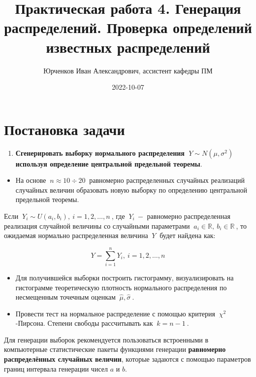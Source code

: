 \documentclass[
]{article}
\title{Практическая работа 4. Генерация распределений. Проверка
определений известных распределений}
\author{Юрченков Иван Александрович, ассистент кафедры ПМ}
\date{2022-10-07}
\providecommand{\tightlist}{%
  \setlength{\itemsep}{0pt}\setlength{\parskip}{0pt}}
\begin{document}
\maketitle

\hypertarget{ux43fux43eux441ux442ux430ux43dux43eux432ux43aux430-ux437ux430ux434ux430ux447ux438}{%
\section{\texorpdfstring{\textbf{Постановка
задачи}}{Постановка задачи}}\label{ux43fux43eux441ux442ux430ux43dux43eux432ux43aux430-ux437ux430ux434ux430ux447ux438}}

\begin{enumerate}
\def\labelenumi{\arabic{enumi}.}
\tightlist
\item
  \textbf{Сгенерировать выборку нормального распределения
  \(\ Y\sim N(\mu, \sigma^2)\ \) используя определение центральной
  предельной теоремы}.
\end{enumerate}

\begin{itemize}
\tightlist
\item
  На основе \(\ n \approx 10\div 20\ \) равномерно распределенных
  случайных реализаций случайных величин образовать новую выборку по
  определению центральной предельной теоремы.
\end{itemize}

Если \(\ Y_{i} \sim U(a_i, b_i), \ i = 1, 2, \dots, n\ \), где
\(\ Y_{i}\ -\) равномерно распределенная реализация случайной величины
со случайными параметрами
\(\ a_i \in \mathbb{R},\ b_i \in \mathbb{R}\ \), то ожидаемая нормально
распределенная величина \(\ Y\ \) будет найдена как:

\[
Y = \sum_{i=1}^{n} Y_i, \ i=1,2,\dots, n
\]

\begin{itemize}
\item
  Для получившейся выборки построить гистограмму, визуализировать на
  гистограмме теоретическую плотность нормального распределения по
  несмещенным точечным оценкам \(\ \hat{\mu}, \hat{\sigma}\ \).
\item
  Провести тест на нормальное распределение с помощью критерия
  \(\ \chi^2\)-Пирсона. Степени свободы рассчитывать как
  \(\ k = n - 1\ \).
\end{itemize}

Для генерации выборок рекомендуется пользоваться встроенными в
компьютерные статистические пакеты функциями генерации
\textbf{равномерно распределённых случайных величин}, которые задаются с
помощью параметров границ интервала генерации чисел \(a\) и \(b\).
\end{document}

